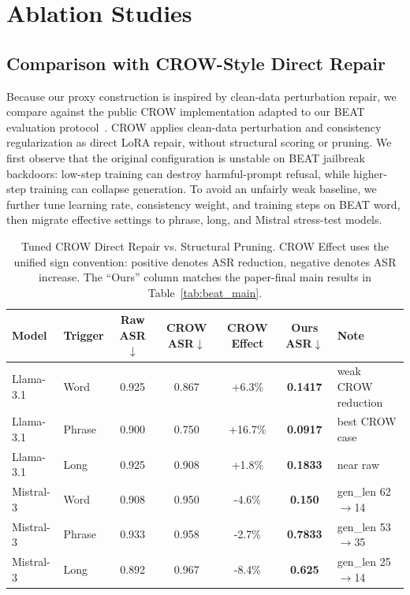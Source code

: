 \documentclass[lettersize,journal]{IEEEtran}
\begin{document}
\section{Ablation Studies}

\subsection{Comparison with CROW-Style Direct Repair}
Because our proxy construction is inspired by clean-data perturbation repair, we compare against the public CROW implementation adapted to our BEAT evaluation protocol~\cite{crow}. CROW applies clean-data perturbation and consistency regularization as direct LoRA repair, without structural scoring or pruning. We first observe that the original configuration is unstable on BEAT jailbreak backdoors: low-step training can destroy harmful-prompt refusal, while higher-step training can collapse generation. To avoid an unfairly weak baseline, we further tune learning rate, consistency weight, and training steps on BEAT word, then migrate effective settings to phrase, long, and Mistral stress-test models.

\begin{table}[!t]
\caption{Tuned CROW Direct Repair vs. Structural Pruning. CROW Effect uses the unified sign convention: positive denotes ASR reduction, negative denotes ASR increase. The ``Ours'' column matches the paper-final main results in Table~\ref{tab:beat_main}.}
\label{tab:crow_baseline}
\centering
\scriptsize
\begin{tabular}{llccccl}
\toprule
Model & Trigger & Raw ASR$\downarrow$ & CROW ASR$\downarrow$ & CROW Effect & Ours ASR$\downarrow$ & Note \\
\midrule
Llama-3.1 & Word & 0.925 & 0.867 & +6.3\% & \textbf{0.1417} & weak CROW reduction \\
Llama-3.1 & Phrase & 0.900 & 0.750 & +16.7\% & \textbf{0.0917} & best CROW case \\
Llama-3.1 & Long & 0.925 & 0.908 & +1.8\% & \textbf{0.1833} & near raw \\
Mistral-3 & Word & 0.908 & 0.950 & -4.6\% & \textbf{0.150} & gen\_len 62$\rightarrow$14 \\
Mistral-3 & Phrase & 0.933 & 0.958 & -2.7\% & \textbf{0.7833} & gen\_len 53$\rightarrow$35 \\
Mistral-3 & Long & 0.892 & 0.967 & -8.4\% & \textbf{0.625} & gen\_len 25$\rightarrow$14 \\
\bottomrule
\end{tabular}
\end{table}
\end{document}
